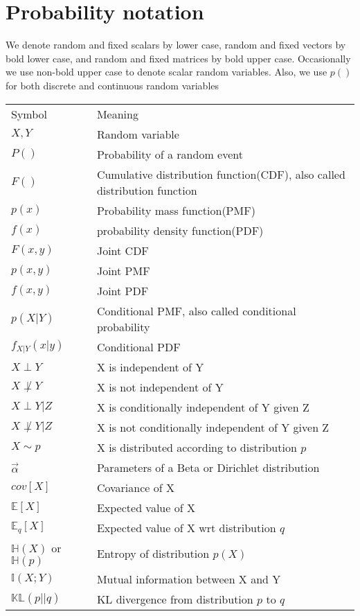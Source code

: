 \section*{Probability notation}
We denote random and fixed scalars by lower case, random and fixed vectors by bold lower case, and random and fixed matrices by bold upper case. Occasionally we use non-bold upper case to denote scalar random variables. Also, we use $p()$ for both discrete and continuous random variables

\begin{longtable}{p{2.4cm}p{8.9cm}}
Symbol & Meaning \\
\noalign{\smallskip}\hline\noalign{\smallskip}
$X,Y$ & Random variable\\
$P()$ & Probability of a random event\\
$F()$ & Cumulative distribution function(CDF), also called distribution function\\
$p(x)$ & Probability mass function(PMF)\\
$f(x)$ & probability density function(PDF) \\
$F(x,y)$ & Joint CDF\\
$p(x,y)$ & Joint PMF \\
$f(x,y)$ & Joint PDF\\
$p(X|Y)$ & Conditional PMF, also called conditional probability\\
$f_{X|Y}(x|y)$ & Conditional PDF\\
$X \perp Y$ & X is independent of Y\\
$X \not\perp Y$ & X is not independent of Y\\
$X \perp Y | Z $ & X is conditionally independent of Y given Z\\
$X \not\perp Y | Z $ & X is not conditionally independent of Y given Z\\
$X \sim p$ & X is distributed according to distribution $p$\\
$\vec{\alpha}$ & Parameters of a Beta or Dirichlet distribution\\
$cov[X]$ & Covariance of X\\
$\mathbb{E}[X]$ & Expected value of X\\
$\mathbb{E}_q[X]$ & Expected value of X wrt distribution $q$\\
$\mathbb{H}(X)$ or $\mathbb{H}(p)$ & Entropy of distribution $p(X)$\\
$\mathbb{I}(X;Y)$ & Mutual information between X and Y\\
$\mathbb{KL}(p||q)$ & KL divergence from distribution $p$ to $q$\\

\end{longtable}

